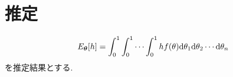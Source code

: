 \section{推定}
\begin{equation} \label{eq:exp}
    E_{\boldsymbol{\theta}} [h] = \int_{0}^{1} \int_{0}^{1} \cdots \int_{0}^{1} h f(\theta) \mathrm{d}\theta_1 \mathrm{d}\theta_2 \cdots \mathrm{d}\theta_n
\end{equation}
を推定結果とする. 

